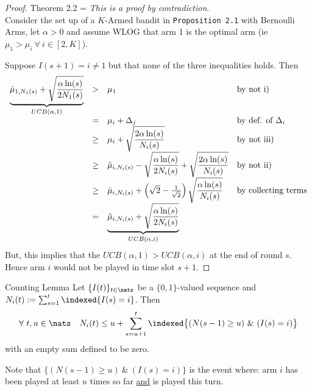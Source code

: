 \documentclass[11pt,a4paper]{article}
\begin{document}
  \begin{proof}{Theorem 2.2}
    \everymath={\displaystyle}
    \textit{This is a proof by contradiction}.\\
    Consider the set up of a $K$-Armed bandit in \texttt{Proposition 2.1} with Bernoulli Arms, let $\alpha>0$ and assume WLOG that arm 1 is the optimal arm (ie $\mu_1>\mu_i\ \forall\ i\in[2,K]$).
    \par Suppose $I(s+1)=i\neq1$ but that none of the three inequalities holds. Then
    \[\begin{array}{rcll}
      \underbrace{\hat\mu_{1,N_1(s)}+\displaystyle\sqrt{\frac{\alpha\ln(s)}{2N_1(s)}}}_{\tiny{UCB(\alpha,1)}}&>&\mu_1&\text{by not i)}\\
      &=&\mu_i+\Delta_j&\text{by def. of $\Delta_i$}\\
      &\geq&\mu_i+\displaystyle\sqrt{\frac{2\alpha\ln(s)}{N_i(s)}}&\text{by not iii)}\\
      &\geq&\hat\mu_{i,N_i(s)}-\displaystyle\sqrt{\frac{\alpha\ln(s)}{2N_i(s)}}+\sqrt{\frac{2\alpha\ln(s)}{N_i(s)}}&\text{by not ii)}\\
      &\geq&\hat\mu_{i,N_i(s)}+\left(\sqrt2-\frac1{\sqrt2}\right)\sqrt{\dfrac{\alpha\ln(s)}{N_i(s)}}&\text{by collecting terms}\\
      &=&\underbrace{\hat\mu_{i,N_i(s)}+\sqrt{\frac{\alpha\ln(s)}{2N_i(s)}}}_{\tiny{UCB(\alpha,i)}}
    \end{array}\]
    But, this implies that the $UCB(\alpha,1)>UCB(\alpha,i)$ at the end of round $s$. Hence arm $i$ would not be played in time slot $s+1$.\proved
  \end{proof}

  \begin{theorem}{Counting Lemma}
    Let $\{I(t)\}_{t\in\nats}$ be a $\{0,1\}$-valued sequence and $N_i(t):=\sum_{s=1}^t\indexed{I(s)=i}$. Then
    \[ \forall\ t,u\in\nats\quad N_i(t)\leq u+\sum_{s=u+1}^t\indexed\big\{(N(s-1)\geq u)\ \&\ (I(s)=i)\big\} \]
    with an empty sum defined to be zero.
    \par Note that $\big\{(N(s-1)\geq u)\ \&\ (I(s)=i)\big\}$ is the event where: arm $i$ has been played at least $u$ times so far \underline{and} is played this turn.
  \end{theorem}
\end{document}
